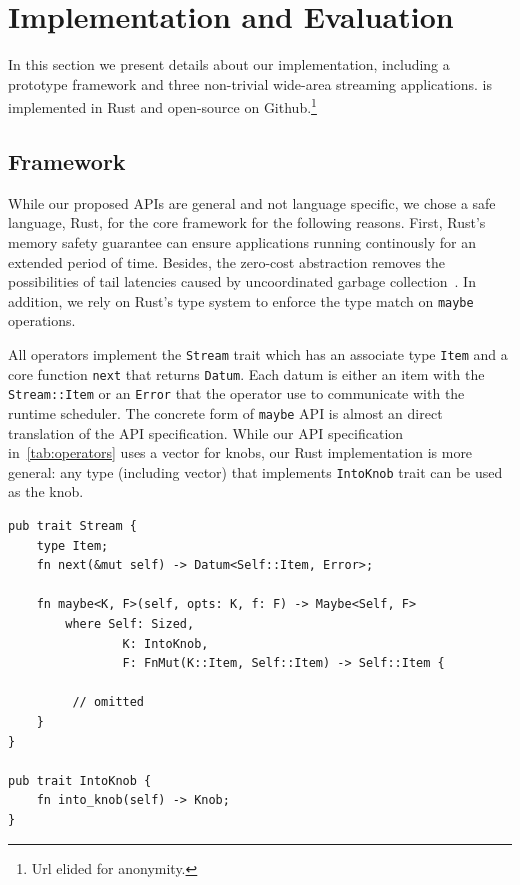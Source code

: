 \chapter{Implementation and Evaluation}
\label{sec:implementation}

In this section we present details about our implementation, including a
prototype framework and three non-trivial wide-area streaming applications.
\sysname{} is implemented in Rust and open-source on Github.\footnote{Url elided
  for anonymity.}

\section{Framework}
\label{sec:framework}

While our proposed APIs are general and not language specific, we chose a safe
language, Rust, for the core framework for the following reasons. First, Rust's
memory safety guarantee can ensure applications running continously for an
extended period of time. Besides, the zero-cost abstraction removes the
possibilities of tail latencies caused by uncoordinated garbage
collection~\cite{maas2016taurus}. In addition, we rely on Rust's type system to
enforce the type match on \texttt{maybe} operations.

\begin{sloppypar}
All operators implement the \texttt{Stream} trait which has an associate type
\texttt{Item} and a core function \texttt{next} that returns
\texttt{Datum}. Each datum is either an item with the \texttt{Stream::Item} or
an \texttt{Error} that the operator use to communicate with the runtime
scheduler. The concrete form of \texttt{maybe} API is almost an direct
translation of the API specification. While our API specification
in~\autoref{tab:operators} uses a vector for knobs, our Rust implementation is
more general: any type (including vector) that implements \texttt{IntoKnob}
trait can be used as the knob.
\end{sloppypar}

\begin{lstlisting}
pub trait Stream {
    type Item;
    fn next(&mut self) -> Datum<Self::Item, Error>;

    fn maybe<K, F>(self, opts: K, f: F) -> Maybe<Self, F>
        where Self: Sized,
                K: IntoKnob,
                F: FnMut(K::Item, Self::Item) -> Self::Item {

         // omitted
    }
}

pub trait IntoKnob {
    fn into_knob(self) -> Knob;
}
\end{lstlisting}

